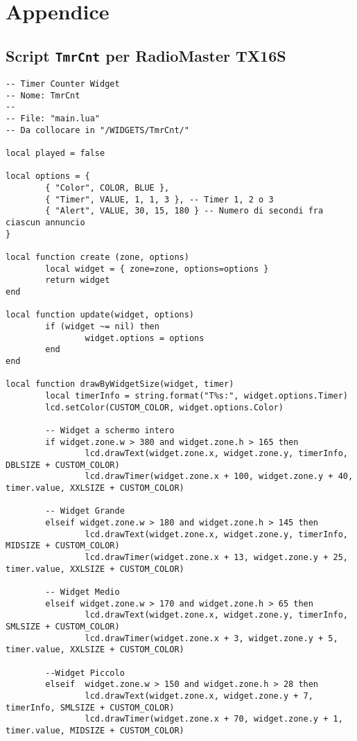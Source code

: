 \chapter*{Appendice}
\section*{Script \texttt{TmrCnt} per RadioMaster TX16S}

\begin{lstlisting}
-- Timer Counter Widget
-- Nome: TmrCnt
--
-- File: "main.lua"
-- Da collocare in "/WIDGETS/TmrCnt/"

local played = false

local options = {
        { "Color", COLOR, BLUE }, 
        { "Timer", VALUE, 1, 1, 3 }, -- Timer 1, 2 o 3
        { "Alert", VALUE, 30, 15, 180 } -- Numero di secondi fra ciascun annuncio
}

local function create (zone, options)
        local widget = { zone=zone, options=options }
        return widget
end

local function update(widget, options)
        if (widget ~= nil) then
                widget.options = options
        end
end

local function drawByWidgetSize(widget, timer)
        local timerInfo = string.format("T%s:", widget.options.Timer)
        lcd.setColor(CUSTOM_COLOR, widget.options.Color)

        -- Widget a schermo intero
        if widget.zone.w > 380 and widget.zone.h > 165 then
                lcd.drawText(widget.zone.x, widget.zone.y, timerInfo, DBLSIZE + CUSTOM_COLOR)
                lcd.drawTimer(widget.zone.x + 100, widget.zone.y + 40, timer.value, XXLSIZE + CUSTOM_COLOR)

        -- Widget Grande
        elseif widget.zone.w > 180 and widget.zone.h > 145 then
                lcd.drawText(widget.zone.x, widget.zone.y, timerInfo, MIDSIZE + CUSTOM_COLOR)
                lcd.drawTimer(widget.zone.x + 13, widget.zone.y + 25, timer.value, XXLSIZE + CUSTOM_COLOR)

        -- Widget Medio
        elseif widget.zone.w > 170 and widget.zone.h > 65 then
                lcd.drawText(widget.zone.x, widget.zone.y, timerInfo, SMLSIZE + CUSTOM_COLOR)
                lcd.drawTimer(widget.zone.x + 3, widget.zone.y + 5, timer.value, XXLSIZE + CUSTOM_COLOR)

        --Widget Piccolo
        elseif  widget.zone.w > 150 and widget.zone.h > 28 then
                lcd.drawText(widget.zone.x, widget.zone.y + 7, timerInfo, SMLSIZE + CUSTOM_COLOR)
                lcd.drawTimer(widget.zone.x + 70, widget.zone.y + 1, timer.value, MIDSIZE + CUSTOM_COLOR)


\end{lstlisting}
